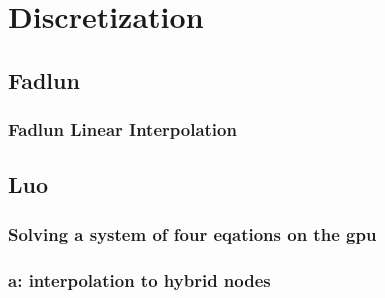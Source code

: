 \documentclass[onehalf,11pt]{beavtex}
\begin{document}



\appendix
\chapter{Discretization}
\section{Fadlun}
\subsection{Fadlun Linear Interpolation}\label{Fadlun Linear Interpolation}
\section{Luo}
\subsection{Solving a system of four eqations on the gpu}\label{system of euqations}
\subsection{a: interpolation to hybrid nodes}
\label{a: interpolation to hybrid nodes}
\end{document}
